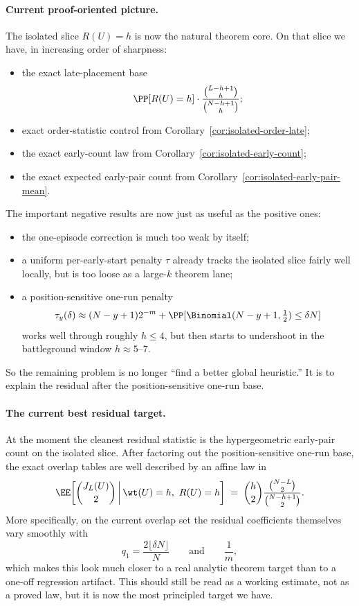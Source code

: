 \paragraph{Current proof-oriented picture.}
The isolated slice \(R(U)=h\) is now the natural theorem core.
On that slice we have, in increasing order of sharpness:
\begin{itemize}
\item the exact late-placement base
\[
\PP[R(U)=h]\cdot \frac{\binom{L-h+1}{h}}{\binom{N-h+1}{h}};
\]
\item exact order-statistic control from Corollary~\ref{cor:isolated-order-late};
\item the exact early-count law from Corollary~\ref{cor:isolated-early-count};
\item the exact expected early-pair count from Corollary~\ref{cor:isolated-early-pair-mean}.
\end{itemize}
The important negative results are now just as useful as the positive ones:
\begin{itemize}
\item the one-episode correction is much too weak by itself;
\item a uniform per-early-start penalty \(\tau\) already tracks the isolated slice fairly well locally, but is too loose
as a large-\(k\) theorem lane;
\item a position-sensitive one-run penalty
\[
\tau_y(\delta)\approx (N-y+1)2^{-m}+\PP[\Binomial(N-y+1,\tfrac12)\le \delta N]
\]
works well through roughly \(h\le 4\), but then starts to undershoot in the battleground window \(h\approx 5\text{--}7\).
\end{itemize}
So the remaining problem is no longer ``find a better global heuristic.'' It is to explain the residual after the
position-sensitive one-run base.

\paragraph{The current best residual target.}
At the moment the cleanest residual statistic is the hypergeometric early-pair count on the isolated slice.
After factoring out the position-sensitive one-run base, the exact overlap tables are well described by an affine law
in
\[
\EE\!\left[\binom{J_L(U)}{2}\,\middle|\, \wt(U)=h,\ R(U)=h\right]
\;=\;
\binom{h}{2}\frac{\binom{N-L}{2}}{\binom{N-h+1}{2}}.
\]
More specifically, on the current overlap set the residual coefficients themselves vary smoothly with
\[
q_1=\frac{2\lfloor \delta N\rfloor}{N}
\qquad\text{and}\qquad \frac{1}{m},
\]
which makes this look much closer to a real analytic theorem target than to a one-off regression artifact.
This should still be read as a working estimate, not as a proved law, but it is now the most principled target we have.

